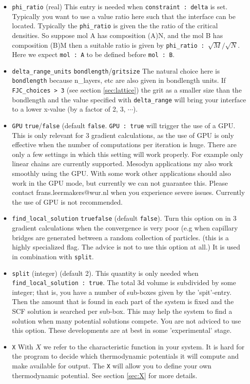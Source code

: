 \documentclass{article}
\begin{document}
\begin{itemize}
\item {\tt phi\_ratio} (real) This entry is needed when {\tt constraint : delta} is set. Typically you want to use a value ratio here such that the interface can be located. Typically the {\tt phi\_ratio} is given  the the ratio of the critical densities. So suppose mol A has composition (A)N, and the mol B has composition (B)M then a suitable ratio is given by {\tt phi\_ratio : $\sqrt{M}/\sqrt{N}$}. Here we expect {\tt mol : A} to be defined before {\tt mol : B}. 

\item {\tt delta\_range\_units}  {\tt bondlength}/{\tt gritsize} The natural choice here is {\tt bondlength} because {n\_layers}, etc are also given in bondlength units. If {\tt FJC\_choices > 3} (see section \ref{sec:lattice}) the grit as a smaller size than the bondlength and the value specified with {\tt delta\_range} will bring your interface to a lower x-value (by a factor of 2, 3, $\cdots$).

\item {\tt GPU} {\tt true}/{\tt false} (default {\tt false}.  {\tt GPU : true} will trigger the use of a GPU. This is only relevant for 3 gradient calculations, as the use of GPU is only effective when the number of computations per iteration is huge. There are only a few settings in which this setting will work properly. For example only linear chains are currently supported. Mesodyn applications my also work smoothly using the GPU. With some work other applications should also work in the GPU mode, but currently we can not guarantee this. Please contact frans.leermakers@wur.nl when you experience severe issues. Currently the use of GPU is not recommended.

\item {\tt find\_local\_solution} {\tt true}{\tt false} (default {\tt false}). Turn this option on in 3 gradient calculations when the convergence is very poor (e.g when capillary bridges are generated between a random collection of particles. (this is a highly specialized flag. The advice is not to use this option at all.) It is used in combination with {\tt split}.

\item {\tt split} (integer) (default 2). This quantity is only needed when {\tt find\_local\_solution : true}. The total 3d volume is subdivided by some integer; that is, you have a number of sub-boxes given by the 'spit'-entry. Then the amount that is found in each part of the system is fixed and the SCF solution is searched per sub-box. This may help the system to find a solution when many potential solutions compete. You are not adviced to use this option. These developments are at best in some 'experimental' stage. 

\item {\tt X} With $X$ we refer to the characteristic function in your system. It is hard for the program to decide which thermodynamic potentials it will compute and make available for output. The  {\tt X} will allow you to define your own thermodynamic potential. See section \ref{sec:X} for more details.

\end{itemize}
\end{document}
